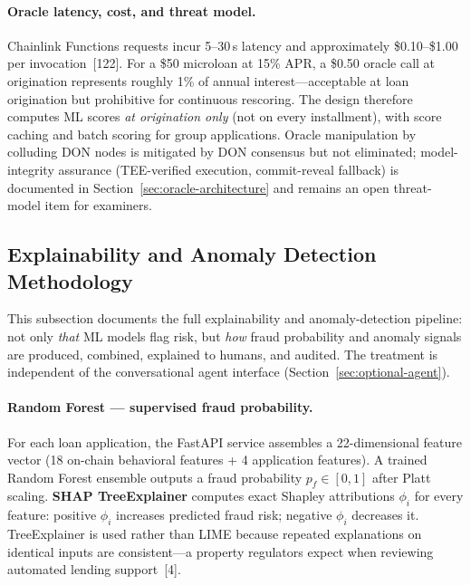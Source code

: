 \documentclass[12pt,a4paper]{report}
\begin{document}
\paragraph{Oracle latency, cost, and threat model.}
Chainlink Functions requests incur 5--30\,s latency and approximately \$0.10--\$1.00 per invocation~[122]. For a \$50 microloan at 15\% APR, a \$0.50 oracle call at origination represents roughly 1\% of annual interest---acceptable at loan origination but prohibitive for continuous rescoring. The design therefore computes ML scores \textit{at origination only} (not on every installment), with score caching and batch scoring for group applications. Oracle manipulation by colluding DON nodes is mitigated by DON consensus but not eliminated; model-integrity assurance (TEE-verified execution, commit-reveal fallback) is documented in Section~\ref{sec:oracle-architecture} and remains an open threat-model item for examiners.

\subsection{Explainability and Anomaly Detection Methodology}
\label{sec:ml-explainability}

This subsection documents the full explainability and anomaly-detection pipeline: not only \textit{that} ML models flag risk, but \textit{how} fraud probability and anomaly signals are produced, combined, explained to humans, and audited. The treatment is independent of the conversational agent interface (Section~\ref{sec:optional-agent}).

\paragraph{Random Forest --- supervised fraud probability.}
For each loan application, the FastAPI service assembles a 22-dimensional feature vector (18 on-chain behavioral features + 4 application features). A trained Random Forest ensemble outputs a fraud probability $p_f \in [0,1]$ after Platt scaling. \textbf{SHAP TreeExplainer} computes exact Shapley attributions $\phi_i$ for every feature: positive $\phi_i$ increases predicted fraud risk; negative $\phi_i$ decreases it. TreeExplainer is used rather than LIME because repeated explanations on identical inputs are consistent---a property regulators expect when reviewing automated lending support~[4].
\end{document}
